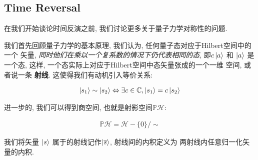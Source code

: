\subsection{Time Reversal}

在我们开始谈论时间反演之前, 我们讨论更多关于量子力学对称性的问题.

我们首先回顾量子力学的基本原理, 我们认为, 任何量子态对应于Hilbert空间中的一个
矢量, \emph{同时他们在乘以一个复系数的情况下仍代表相同的态}, 即$c \ket{a}$ 和
$\ket{a}$ 是一个态, 这样, 一个态实际上对应于Hilbert空间中态矢量张成的一个一维
空间, 或者说一条 {\bf 射线}. 这使得我们有动机引入等价关系:

\begin{equation}
  \begin{aligned}
    \ket{s_1} \sim \ket{s_2} \Leftrightarrow \exists c \in \mathbb{C}, \ket{s_1} = c \ket{s_2}
  \end{aligned}
\end{equation}

进一步的, 我们可以得到商空间, 也就是射影空间$\mathbb{P} \mathcal{H}$:

\begin{equation}
  \begin{aligned}
    \mathbb{P} \mathcal{H} = \mathcal{H} - \{0\} / \sim
  \end{aligned}
\end{equation}

我们将矢量 $\ket{s}$ 属于的射线记作$\ket{\overline{s}}$, 射线间的内积定义为
两射线内任意归一化矢量的内积.
